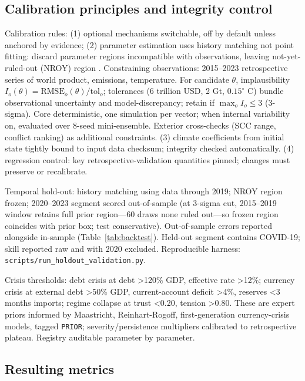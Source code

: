 \documentclass[a4paper,fleqn]{cas-sc}
\begin{document}
\subsection{Calibration principles and integrity control}

Calibration rules: (1) optional mechanisms switchable, off by default unless anchored by evidence; (2) parameter estimation uses history matching not point fitting: discard parameter regions incompatible with observations, leaving not-yet-ruled-out (NROY) region \citep{williamson2013}. Constraining observations: 2015--2023 retrospective series of world product, emissions, temperature. For candidate $\theta$, implausibility $I_o(\theta) = \mathrm{RMSE}_o(\theta) / \mathrm{tol}_o$; tolerances (6 trillion USD, 2 Gt, $0.15^{\circ}$ C) bundle observational uncertainty and model-discrepancy; retain if $\max_o I_o \le 3$ (3-sigma). Core deterministic, one simulation per vector; when internal variability on, evaluated over 8-seed mini-ensemble. Exterior cross-checks (SCC range, conflict ranking) as additional constraints. (3) climate coefficients from initial state tightly bound to input data checksum; integrity checked automatically. (4) regression control: key retrospective-validation quantities pinned; changes must preserve or recalibrate.

Temporal hold-out: history matching using data through 2019; NROY region frozen; 2020--2023 segment scored out-of-sample (at 3-sigma cut, 2015--2019 window retains full prior region---60 draws none ruled out---so frozen region coincides with prior box; test conservative). Out-of-sample errors reported alongside in-sample (Table~\ref{tab:backtest}). Held-out segment contains COVID-19; skill reported raw and with 2020 excluded. Reproducible harness: \texttt{scripts/run\_holdout\_validation.py}.

Crisis thresholds: debt crisis at debt >120\% GDP, effective rate >12\%; currency crisis at external debt >50\% GDP, current-account deficit >4\%, reserves <3 months imports; regime collapse at trust <0.20, tension >0.80. These are expert priors informed by Maastricht, Reinhart-Rogoff, first-generation currency-crisis models, tagged \texttt{PRIOR}; severity/persistence multipliers calibrated to retrospective plateau. Registry auditable parameter by parameter.

\subsection{Resulting metrics}
\end{document}
